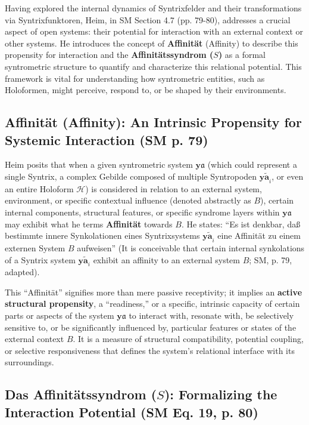 \documentclass[
    12pt,              %
    a4paper,           %
    headings=normal,   %
    twoside=true,      %
    BCOR=8mm,          %
]{scrbook}
\newcommand{\q}[1]{\enquote{#1}}
\newcommand{\syntrix}{\bm{y\widetilde{a}}}
\newcommand{\affinitaetssyndrom}{S}
\begin{document}
Having explored the internal dynamics of Syntrixfelder and their transformations via Syntrixfunktoren, Heim, in SM Section 4.7 (pp. 79-80), addresses a crucial aspect of open systems: their potential for interaction with an external context or other systems. He introduces the concept of \textbf{Affinität} (Affinity) to describe this propensity for interaction and the \textbf{Affinitätssyndrom (\(\affinitaetssyndrom\))} as a formal syntrometric structure to quantify and characterize this relational potential. This framework is vital for understanding how syntrometric entities, such as Holoformen, might perceive, respond to, or be shaped by their environments.

\subsection{Affinität (Affinity): An Intrinsic Propensity for Systemic Interaction (SM p. 79)}
\label{sec:ch4_aff_propensity_revised_2}

Heim posits that when a given syntrometric system \(\bm{y\mathfrak{a}}\) (which could represent a single Syntrix, a complex Gebilde composed of multiple Syntropoden \(\syntrix_i\), or even an entire Holoform \(\mathcal{H}\)) is considered in relation to an external system, environment, or specific contextual influence (denoted abstractly as \(B\)), certain internal components, structural features, or specific syndrome layers within \(\bm{y\mathfrak{a}}\) may exhibit what he terms \textbf{Affinität} towards \(B\). He states: \q{Es ist denkbar, daß bestimmte innere Synkolationen eines Syntrixsystems \(\syntrix_i\) eine Affinität zu einem externen System \(B\) aufweisen} (It is conceivable that certain internal synkolations of a Syntrix system \(\syntrix_i\) exhibit an affinity to an external system \(B\); SM, p. 79, adapted).

This \q{Affinität} signifies more than mere passive receptivity; it implies an \textbf{active structural propensity}, a \q{readiness,} or a specific, intrinsic capacity of certain parts or aspects of the system \(\bm{y\mathfrak{a}}\) to interact with, resonate with, be selectively sensitive to, or be significantly influenced by, particular features or states of the external context \(B\). It is a measure of structural compatibility, potential coupling, or selective responsiveness that defines the system's relational interface with its surroundings.

\subsection{Das Affinitätssyndrom (\(\affinitaetssyndrom\)): Formalizing the Interaction Potential (SM Eq. 19, p. 80)}
\label{sec:ch4_aff_formalizing_revised_2}
\end{document}
